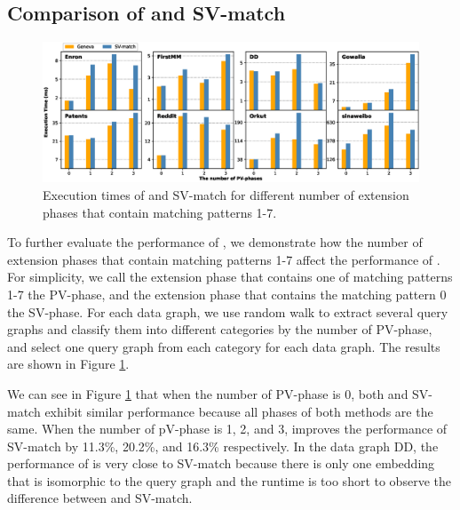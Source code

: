 \subsection{Comparison of \SystemName and SV-match} \label{sec:comparesv}
\begin{figure}
\centering
\includegraphics[width=\textwidth]{./figure/compareSV.eps}
\caption{Execution times of \SystemName and SV-match for different number of extension phases that contain matching patterns 1-7.}	
\label{fig:compareSV}
\end{figure}
To further evaluate the performance of \SystemName, we demonstrate how the number of extension phases that contain matching patterns 1-7 affect the performance of \SystemName. For simplicity, we call the extension phase that contains one of matching patterns 1-7 the PV-phase, and the extension phase that contains the matching pattern 0 the SV-phase. For each data graph, we use random walk to extract several query graphs and classify them into different categories by the number of PV-phase, and select one query graph from each category for each data graph. The results are shown in Figure \ref{fig:compareSV}.

We can see in Figure \ref{fig:compareSV} that when the number of PV-phase is 0, both \SystemName and SV-match exhibit similar performance because all phases of both methods are the same. When the number of pV-phase is 1, 2, and 3, \SystemName improves the performance of SV-match by 11.3\%, 20.2\%, and 16.3\% respectively. In the data graph DD, the performance of \SystemName is very close to SV-match because there is only one embedding that is isomorphic to the query graph and the runtime is too short to observe the difference between \SystemName and SV-match.
